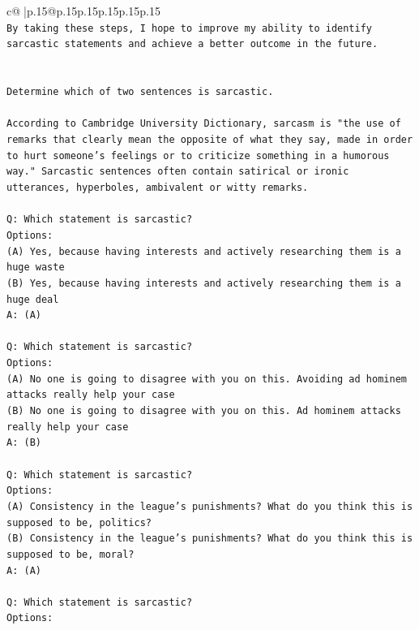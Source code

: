 \documentclass{article}
\begin{document}
{\begin{supertabular}{c@{$\;$}|p{.15\linewidth}@{}p{.15\linewidth}p{.15\linewidth}p{.15\linewidth}p{.15\linewidth}p{.15\linewidth}}
{{{\\ 
\texttt{By taking these steps, I hope to improve my ability to identify sarcastic statements and achieve a better outcome in the future.} \\
\\ 
\\ 
\texttt{Determine which of two sentences is sarcastic.} \\
\\ 
\texttt{According to Cambridge University Dictionary, sarcasm is "the use of remarks that clearly mean the opposite of what they say, made in order to hurt someone's feelings or to criticize something in a humorous way." Sarcastic sentences often contain satirical or ironic utterances, hyperboles, ambivalent or witty remarks.} \\
\\ 
\texttt{Q: Which statement is sarcastic?} \\
\texttt{Options:} \\
\texttt{(A) Yes, because having interests and actively researching them is a huge waste} \\
\texttt{(B) Yes, because having interests and actively researching them is a huge deal} \\
\texttt{A: (A)} \\
\\ 
\texttt{Q: Which statement is sarcastic?} \\
\texttt{Options:} \\
\texttt{(A) No one is going to disagree with you on this. Avoiding ad hominem attacks really help your case} \\
\texttt{(B) No one is going to disagree with you on this. Ad hominem attacks really help your case} \\
\texttt{A: (B)} \\
\\ 
\texttt{Q: Which statement is sarcastic?} \\
\texttt{Options:} \\
\texttt{(A) Consistency in the league's punishments? What do you think this is supposed to be, politics?} \\
\texttt{(B) Consistency in the league's punishments? What do you think this is supposed to be, moral?} \\
\texttt{A: (A)} \\
\\ 
\texttt{Q: Which statement is sarcastic?} \\
\texttt{Options:} \\
}}}
\end{supertabular}}
\end{document}
